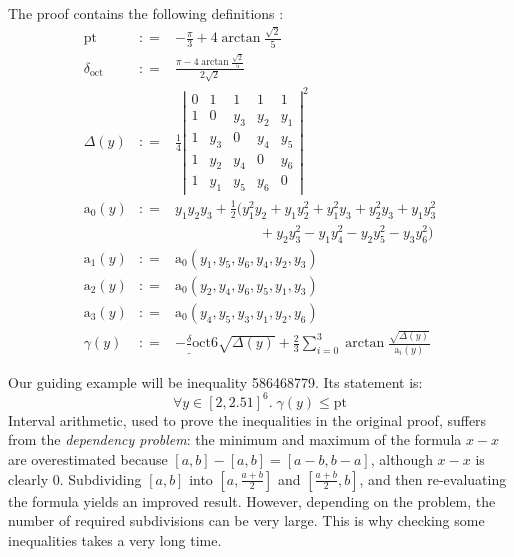 \documentclass[11pt]{amsart}
\def\coloneq{\mathrel{\mathop:}=}
\def\sfrac#1#2{{\textstyle \frac {#1} {#2}}}
\def\pt{\mathrm{pt}}
\def\doct{\delta_{\mathrm{oct}}}
\def\asolid{\mathrm{a}}
\begin{document}
The proof contains the following definitions \cite{sp1}:
\begin{eqnarray*}
\pt &\coloneq& - \frac \pi 3 + 4 \arctan \frac{\sqrt 2}5\\
\doct &\coloneq& \frac {\pi - 4 \arctan \frac{\sqrt 2}5}{2 \sqrt 2}\\
\Delta(y) &\coloneq& \frac 1 4
  \left|
  \begin{array}{ccccc}
    0 & 1 & 1 & 1 & 1 \\
    1 & 0 & y_3 & y_2 & y_1 \\
    1 & y_3 & 0 & y_4 & y_5 \\
    1 & y_2 & y_4 & 0 & y_6 \\
    1 & y_1 & y_5 & y_6 & 0
  \end{array}
  \right|^2
  \\
\asolid_0(y) &\coloneq& y_1 y_2 y_3 + \sfrac 1 2 (
y_1^2 y_2 + y_1 y_2^2 + y_1^2 y_3 + y_2^2 y_3 + y_1 y_3^2 \\
&&\qquad\qquad\qquad {} + y_2 y_3^2 - y_1 y_4^2 - y_2 y_5^2 - y_3 y_6^2)\\
\asolid_1(y) &\coloneq& \asolid_0 (y_1, y_5, y_6, y_4, y_2, y_3)\\
\asolid_2(y) &\coloneq& \asolid_0 (y_2, y_4, y_6, y_5, y_1, y_3)\\
\asolid_3(y) &\coloneq& \asolid_0 (y_4, y_5, y_3, y_1, y_2, y_6)\\
\gamma(y) &\coloneq& 
- \frac \doct 6 \sqrt {\Delta(y)} + \frac 2 3 \sum_{i=0}^3 \arctan \frac
{\sqrt{\Delta(y)}} {\asolid_i(y)}
\end{eqnarray*}

Our guiding example will be inequality 586468779. Its statement is:
\begin{equation}
\forall y \in [2,2.51]^6.\; \gamma(y) \le \pt \label{gamma-pt}
\end{equation}
Interval arithmetic, used to prove the inequalities in the original proof,
suffers from the \emph{dependency problem}: the minimum and maximum of the
formula $x-x$ are overestimated because $[a,b] - [a,b] = [a-b,b-a]$, although
$x-x$ is clearly $0$. Subdividing $[a,b]$ into $[a,\sfrac{a+b}2]$ and
$[\sfrac{a+b}2,b]$, and then re-evaluating the formula yields an improved
result. However, depending on the problem, the number of required subdivisions
can be very large. This is why checking some inequalities takes a very long
time.
\end{document}
